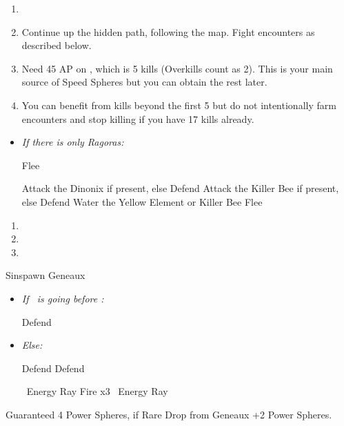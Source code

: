 \begin{enumerate}[resume]
    \item \formation{\tidus}{\wakka}{\lulu}
    \item Continue up the hidden path, following the map. Fight encounters as described below.
    \item Need 45 AP on \tidus, which is 5 kills (Overkills count as 2). This is your main source of Speed Spheres but you can obtain the rest later.
    \item You can benefit from kills beyond the first 5 but do not intentionally farm encounters and stop killing if you have 17 kills already.
\end{enumerate}
\begin{encounters}
    \begin{itemize}
        \item \textit{If there is only Ragoras:}
        \begin{itemize}
            \tidusf Flee
        \end{itemize}
        \tidusf Attack the Dinonix if present, else Defend
        \wakkaf Attack the Killer Bee if present, else Defend
        \luluf Water the Yellow Element or Killer Bee
        \tidusf Flee
    \end{itemize}
\end{encounters}
\begin{enumerate}[resume]
    \item \sd
    \item \formation{\tidus}{\yuna}{\lulu}
    \item \save
\end{enumerate}
\begin{battle}[3000]{Sinspawn Geneaux}
    \begin{itemize}
        \item \textit{If \tidus\ is going before \yuna:}
        \begin{itemize}
            \tidusf Defend
        \end{itemize}
        \item \textit{Else:}
        \begin{itemize}
            \switch{\yuna}{\wakka}
            \wakkaf Defend
            \tidusf Defend
            \switch{\lulu}{\yuna}
        \end{itemize}
        \summon{\valefor}
        \valeforf \od\ Energy Ray
        \valeforf Fire x3
        \valeforf \od\ Energy Ray
    \end{itemize}
    Guaranteed 4 Power Spheres, if Rare Drop from Geneaux +2 Power Spheres.
\end{battle}
